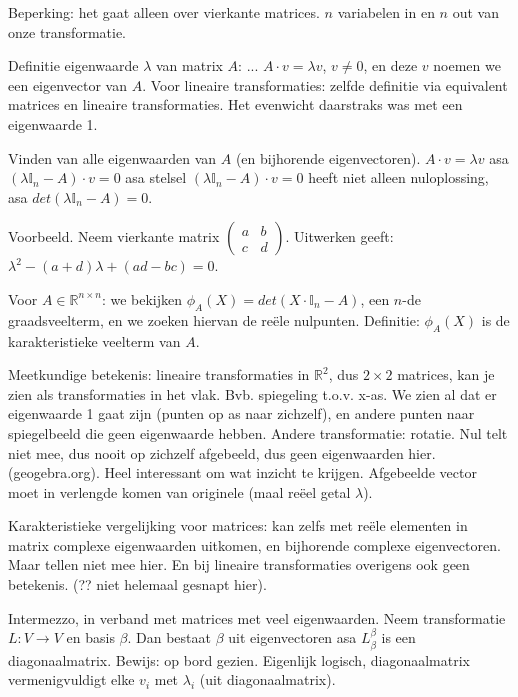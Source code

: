 \documentclass{article}
\begin{document}
Beperking: het gaat alleen over vierkante matrices. $n$ variabelen in en $n$ out van onze transformatie. 

Definitie eigenwaarde $\lambda$ van matrix $A$: ... $A \cdot v = \lambda v$, $v \neq 0$, en deze $v$ noemen we een eigenvector van $A$. Voor lineaire transformaties: zelfde definitie via equivalent matrices en lineaire transformaties. Het evenwicht daarstraks was met een eigenwaarde 1. 

Vinden van alle eigenwaarden van $A$ (en bijhorende eigenvectoren). $A \cdot v = \lambda v$ asa $(\lambda \mathbb{I}_n - A)\cdot v = 0$ asa stelsel $(\lambda \mathbb{I}_n - A)\cdot v = 0 $ heeft niet alleen nuloplossing, asa $det(\lambda \mathbb{I}_n - A) = 0 $. 

Voorbeeld. Neem vierkante matrix $ \begin{pmatrix} a & b \\ c & d \end{pmatrix}$. Uitwerken geeft: $\lambda^2 - (a+d)\lambda + (ad-bc)=0$.

Voor $A \in \mathbb{R}^{n \times n}$: we bekijken $\phi_A(X) = det(X \cdot \mathbb{I}_n -A)$, een $n$-de graadsveelterm, en we zoeken hiervan de re\"ele nulpunten. Definitie: $\phi_A(X)$ is de karakteristieke veelterm van $A$. 

Meetkundige betekenis: lineaire transformaties in $\mathbb{R}^2$, dus  $2 \times 2$ matrices,  kan je zien als transformaties in het vlak. Bvb. spiegeling t.o.v. x-as. We zien al dat er eigenwaarde 1 gaat zijn (punten op as naar zichzelf), en andere punten naar spiegelbeeld die geen eigenwaarde hebben. 
Andere transformatie: rotatie. Nul telt niet mee, dus nooit op zichzelf afgebeeld, dus geen eigenwaarden hier. (geogebra.org). 
Heel interessant om wat inzicht te krijgen. Afgebeelde vector moet in verlengde komen van originele (maal re\"eel getal $\lambda$). 

Karakteristieke vergelijking voor matrices: kan zelfs met re\"ele elementen in matrix complexe eigenwaarden uitkomen, en bijhorende complexe eigenvectoren. Maar tellen niet mee hier. En bij lineaire transformaties overigens ook geen betekenis. (?? niet helemaal gesnapt hier). 

Intermezzo, in verband met matrices met veel eigenwaarden. Neem transformatie $L: V \to V$ en basis $\beta$. Dan bestaat $\beta$ uit eigenvectoren asa $L_\beta^\beta$ is een diagonaalmatrix. 
Bewijs: op bord gezien. Eigenlijk logisch, diagonaalmatrix vermenigvuldigt elke $v_i$ met $\lambda_i$ (uit diagonaalmatrix). 
\end{document}
